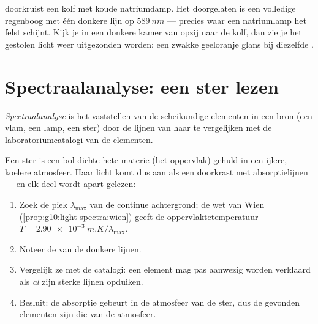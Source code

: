 \begin{example}\label{ex:g10:light-spectra:sodiumflask}
 doorkruist een kolf met koude natriumdamp. Het doorgelaten
 is een volledige regenboog met één donkere lijn op
$\qty{589}{nm}$ --- precies waar een natriumlamp het felst schijnt. Kijk
je in een donkere kamer van opzij naar de kolf, dan zie je het gestolen
licht weer uitgezonden worden: een zwakke geeloranje glans bij diezelfde
.
\end{example}

\section{Spectraalanalyse: een ster lezen}

\begin{definition}[Spectraalanalyse]\label{def:g10:light-spectra:analysis}
\emph{Spectraalanalyse} is het vaststellen van de
scheikundige elementen in een bron (een vlam, een lamp, een ster) door de
lijnen van haar  te vergelijken met de laboratoriumcatalogi van
de elementen.
\end{definition}

\begin{method}\label{met:g10:light-spectra:reading}
Een ster is een bol dichte hete materie (het oppervlak) gehuld in een
ijlere, koelere atmosfeer. Haar licht komt dus aan als een  doorkrast met absorptielijnen --- en elk deel wordt apart
gelezen:
\begin{enumerate}
  \item Zoek de piek $\lambda_{\max}$ van de continue achtergrond; de wet
        van Wien (\cref{prop:g10:light-spectra:wien}) geeft de
        oppervlaktetemperatuur $T = \qty{2.90e-3}{m.K} / \lambda_{\max}$.
  \item Noteer de  van de donkere lijnen.
  \item Vergelijk ze met de catalogi: een element mag pas aanwezig
        worden verklaard als \emph{al} zijn sterke lijnen opduiken.
  \item Besluit: de absorptie gebeurt in de atmosfeer van de ster, dus de
        gevonden elementen zijn die van de atmosfeer.
\end{enumerate}
\end{method}

